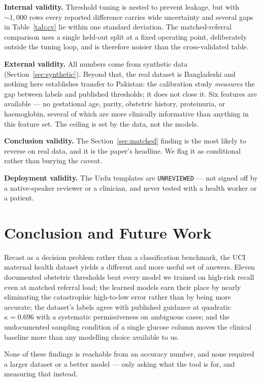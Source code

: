 \documentclass[journal]{IEEEtran}
\begin{document}
\textbf{Internal validity.} Threshold tuning is nested to prevent leakage, but
with $\sim 1{,}000$ rows every reported difference carries wide uncertainty and
several gaps in Table~\ref{tab:cv} lie within one standard deviation. The
matched-referral comparison uses a single held-out split at a fixed operating
point, deliberately outside the tuning loop, and is therefore noisier than the
cross-validated table.

\textbf{External validity.} All numbers come from synthetic data
(Section~\ref{sec:synthetic}). Beyond that, the real dataset is Bangladeshi and
nothing here establishes transfer to Pakistan: the calibration study
\emph{measures} the gap between labels and published thresholds; it does not
close it. Six features are available --- no gestational age, parity, obstetric
history, proteinuria, or haemoglobin, several of which are more clinically
informative than anything in this feature set. The ceiling is set by the data,
not the models.

\textbf{Conclusion validity.} The Section~\ref{sec:matched} finding is the most
likely to reverse on real data, and it is the paper's headline. We flag it as
conditional rather than burying the caveat.

\textbf{Deployment validity.} The Urdu templates are \texttt{UNREVIEWED} --- not
signed off by a native-speaker reviewer or a clinician, and never tested with a
health worker or a patient.

\section{Conclusion and Future Work}

Recast as a decision problem rather than a classification benchmark, the UCI
maternal health dataset yields a different and more useful set of answers.
Eleven documented obstetric thresholds beat every model we trained on high-risk
recall even at matched referral load; the learned models earn their place by
nearly eliminating the catastrophic high-to-low error rather than by being more
accurate; the dataset's labels agree with published guidance at quadratic
$\kappa = 0.696$ with a systematic permissiveness on ambiguous cases; and the
undocumented sampling condition of a single glucose column moves the clinical
baseline more than any modelling choice available to us.

None of these findings is reachable from an accuracy number, and none required a
larger dataset or a better model --- only asking what the tool is for, and
measuring that instead.
\end{document}
